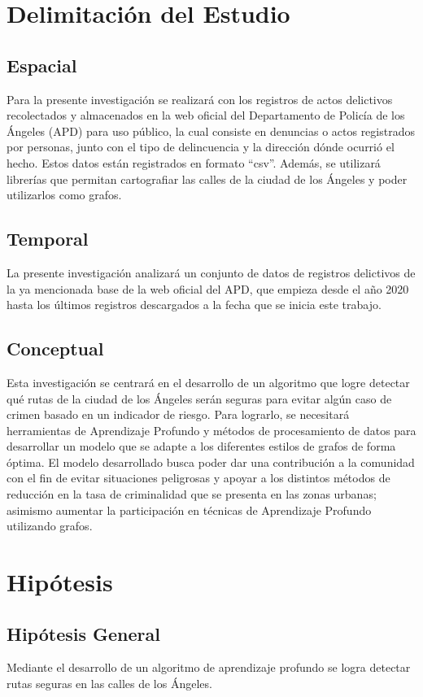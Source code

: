 \section{Delimitación del Estudio}

\subsection{Espacial}
Para la presente investigación se realizará con los registros de actos delictivos recolectados y almacenados en la web oficial del Departamento de Policía de los Ángeles (APD) para uso público, la cual consiste en denuncias o actos registrados por personas, junto con el tipo de delincuencia y la dirección dónde ocurrió el hecho. Estos datos están registrados en formato “csv”. Además, se utilizará librerías que permitan cartografiar las calles de la ciudad de los Ángeles y poder utilizarlos como grafos.
\subsection{Temporal}
La presente investigación analizará un conjunto de datos de registros delictivos de la ya mencionada base de la web oficial del APD, que empieza desde el año 2020 hasta los últimos registros descargados a la fecha que se inicia este trabajo.

\subsection{Conceptual}
Esta investigación se centrará en el desarrollo de un algoritmo que logre detectar qué rutas de la ciudad de los Ángeles serán seguras para evitar algún caso de crimen basado en un indicador de riesgo. Para lograrlo, se necesitará herramientas de Aprendizaje Profundo y métodos de procesamiento de datos para desarrollar un modelo que se adapte a los diferentes estilos de grafos de forma óptima. El modelo desarrollado busca poder dar una contribución a la comunidad con el fin de evitar situaciones peligrosas y apoyar a los distintos métodos de reducción en la tasa de criminalidad que se presenta en las zonas urbanas; asimismo aumentar la participación en técnicas de Aprendizaje Profundo utilizando grafos. 

\section{Hipótesis}

\subsection{Hipótesis General}
\newcommand{\HipotesisGeneral}{
Mediante el desarrollo de un algoritmo de aprendizaje profundo se logra detectar rutas seguras en las calles de los Ángeles.
}
\HipotesisGeneral
